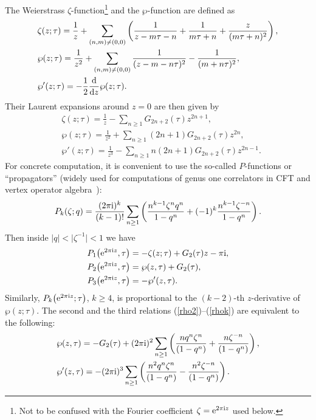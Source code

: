 \documentclass[pdftex]{sigma}
\numberwithin{equation}{section}
\theoremstyle{definition}
\begin{document}
The Weierstrass $\zeta$-function\footnote{Not to be confused with the Fourier coefficient $\zeta={\rm e}^{2 \pi {\rm i} z}$ used below.} and the $\wp$-function are defined as
\begin{align*}
&\zeta(z;\tau) =\frac1z+\sum_{(n,m) \neq (0,0)} \left(\frac{1}{z-m \tau-n}+\frac{1}{m\tau+n}+\frac{z}{(m\tau+n)^2} \right),\\
&\wp(z; \tau) =\frac{1}{z^2}+\sum_{(n,m) \neq (0,0)} \frac{1}{(z-m-n\tau)^2}-\frac{1}{(m+n \tau)^2}, \\
&\wp'(z;\tau)=-\frac{1}{2} \frac{{\rm d}}{{\rm d}z} \wp(z;\tau).
\end{align*}
Their Laurent expansions around $z=0$ are then given by
\begin{align*}
&\zeta(z;\tau) =\frac{1}{z}-\sum_{n \geq 1} G_{2n+2}(\tau)z^{2n+1}, \\
&\wp(z;\tau)=\frac{1}{z^2} + \sum_{n \geq 1} (2n+1)G_{2n+2}(\tau) z^{2n}, \\
&\wp'(z;\tau)=\frac{1}{z^3} - \sum_{n \geq 1} n(2n+1) G_{2n+2}(\tau) z^{2n-1}.
\end{align*}
For concrete computation, it is convenient to use the so-called $P$-functions or ``propagators'' (widely used for computations of genus one correlators in CFT and vertex operator algebra~\cite{Zhu}):
\[
P_k(\zeta;q)=\frac{(2 \pi {\rm i})^k}{(k-1)!} \sum_{n \geq 1} \left( \frac{n^{k-1} \zeta^{n}q^n}{1-q^n}+ (-1)^k \frac{n^{k-1} \zeta^{-n}}{1-q^n} \right).
\]
Then inside $|q|<\bigl|\zeta^{-1}\bigr|<1$ we have
\begin{align}
\label{rho1} &P_1\bigl({\rm e}^{2 \pi {\rm i} z},\tau\bigr)=-\zeta(z;\tau)+G_2(\tau)z -\pi {\rm i}, \\
\label{rho2} &P_2\bigl({\rm e}^{2 \pi {\rm i} z}, \tau\bigr)=\wp(z,\tau)+G_2(\tau), \\
\label{rhok} &P_{3}\bigl({\rm e}^{2 \pi {\rm i} z}, \tau\bigr)=-\wp'(z,\tau).
\end{align}
Similarly, $P_k\bigl({\rm e}^{2 \pi {\rm i} z};\tau\bigr)$, $k \geq 4$, is proportional to the $(k-2)$-th $z$-derivative of $\wp(z;\tau)$.
The second and the third relations (\ref{rho2})--(\ref{rhok}) are equivalent to the following:
\begin{align*} %
& \wp(z,\tau)=-G_2(\tau)+(2 \pi {\rm i})^2 \sum_{n \geq 1} \left( \frac{n q^n \zeta^n }{(1-q^n)}+\frac{n \zeta^{-n} }{(1-q^n)} \right),\\
& \wp'(z,\tau)=-(2 \pi {\rm i})^3 \sum_{n \geq 1} \left( \frac{n^2 q^n \zeta^n }{(1-q^n)}-\frac{n^2 \zeta^{-n} }{(1-q^n)} \right).
\end{align*}
\end{document}
